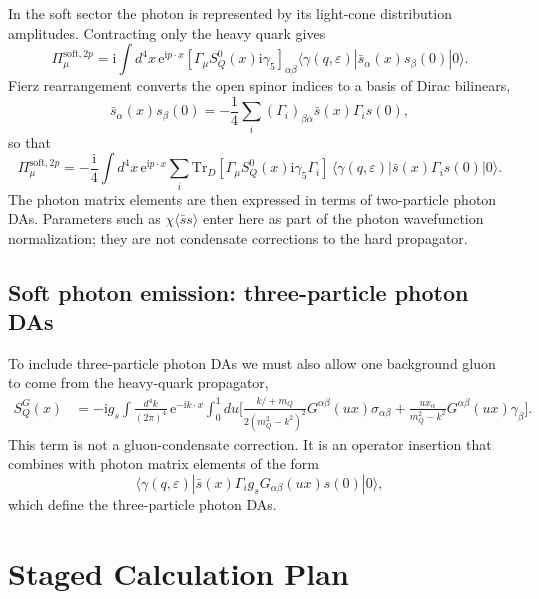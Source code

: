 \documentclass[11pt]{article}
\newcommand{\ii}{\mathrm{i}}
\newcommand{\ee}{\mathrm{e}}
\newcommand{\Tr}{\mathrm{Tr}}
\newcommand{\slashp}[1]{#1\!\!\!/}
\newcommand{\sbar}{\bar s}
\begin{document}
In the soft sector the photon is represented by its light-cone distribution
amplitudes.  Contracting only the heavy quark gives
\begin{equation}
  \Pi_\mu^{\mathrm{soft},2p}
  =
  \ii\int d^4x\,\ee^{\ii p\cdot x}
  [\Gamma_\mu S_Q^0(x)\ii\gamma_5]_{\alpha\beta}
  \langle\gamma(q,\varepsilon)|
  \sbar_\alpha(x)s_\beta(0)
  |0\rangle .
\end{equation}
Fierz rearrangement converts the open spinor indices to a basis of Dirac
bilinears,
\begin{equation}
  \sbar_\alpha(x)s_\beta(0)
  =
  -\frac14\sum_i(\Gamma_i)_{\beta\alpha}
  \sbar(x)\Gamma_i s(0),
\end{equation}
so that
\begin{equation}
  \Pi_\mu^{\mathrm{soft},2p}
  =
  -\frac{\ii}{4}
  \int d^4x\,\ee^{\ii p\cdot x}
  \sum_i
  \Tr_D[\Gamma_\mu S_Q^0(x)\ii\gamma_5\Gamma_i]\,
  \langle\gamma(q,\varepsilon)|
  \sbar(x)\Gamma_i s(0)
  |0\rangle .
\end{equation}
The photon matrix elements are then expressed in terms of two-particle photon
DAs.  Parameters such as $\chi\langle\bar s s\rangle$ enter here as part of the
photon wavefunction normalization; they are not condensate corrections to the
hard propagator.

\subsection{Soft photon emission: three-particle photon DAs}

To include three-particle photon DAs we must also allow one background gluon to
come from the heavy-quark propagator,
\begin{align}
  S_Q^G(x)
  &=
  -\ii g_s
  \int\frac{d^4k}{(2\pi)^4}\,\ee^{-\ii k\cdot x}
  \int_0^1du
  \Bigg[
    \frac{\slashp{k}+m_Q}{2(m_Q^2-k^2)^2}
    G^{\alpha\beta}(ux)\sigma_{\alpha\beta}
    +
    \frac{u x_\alpha}{m_Q^2-k^2}
    G^{\alpha\beta}(ux)\gamma_\beta
  \Bigg].
  \label{eq:gluon-propagator}
\end{align}
This term is not a gluon-condensate correction.  It is an operator insertion
that combines with photon matrix elements of the form
\begin{equation}
  \langle\gamma(q,\varepsilon)|
  \sbar(x)\Gamma_i g_sG_{\alpha\beta}(ux)s(0)
  |0\rangle ,
\end{equation}
which define the three-particle photon DAs.

\section{Staged Calculation Plan}
\end{document}

